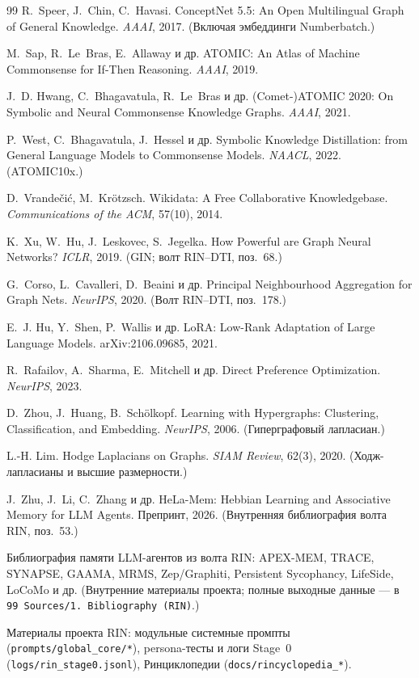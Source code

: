 \begin{thebibliography}{99}
 R.~Speer, J.~Chin, C.~Havasi.
ConceptNet 5.5: An Open Multilingual Graph of General Knowledge. \emph{AAAI},
2017. (Включая эмбеддинги Numberbatch.)

 M.~Sap, R.~Le~Bras, E.~Allaway и др.
ATOMIC: An Atlas of Machine Commonsense for If-Then Reasoning. \emph{AAAI}, 2019.

 J.~D. Hwang, C.~Bhagavatula, R.~Le~Bras и др.
(Comet-)ATOMIC 2020: On Symbolic and Neural Commonsense Knowledge Graphs.
\emph{AAAI}, 2021.

 P.~West, C.~Bhagavatula, J.~Hessel и др.
Symbolic Knowledge Distillation: from General Language Models to Commonsense
Models. \emph{NAACL}, 2022. (ATOMIC10x.)

 D.~Vrande\v{c}i\'c, M.~Kr\"otzsch.
Wikidata: A Free Collaborative Knowledgebase. \emph{Communications of the ACM},
57(10), 2014.

 K.~Xu, W.~Hu, J.~Leskovec, S.~Jegelka.
How Powerful are Graph Neural Networks? \emph{ICLR}, 2019. (GIN; волт RIN–DTI,
поз.~68.)

 G.~Corso, L.~Cavalleri, D.~Beaini и др.
Principal Neighbourhood Aggregation for Graph Nets. \emph{NeurIPS}, 2020.
(Волт RIN–DTI, поз.~178.)

 E.~J. Hu, Y.~Shen, P.~Wallis и др.
LoRA: Low-Rank Adaptation of Large Language Models. arXiv:2106.09685, 2021.

 R.~Rafailov, A.~Sharma, E.~Mitchell и др.
Direct Preference Optimization. \emph{NeurIPS}, 2023.

 D.~Zhou, J.~Huang, B.~Sch\"olkopf.
Learning with Hypergraphs: Clustering, Classification, and Embedding.
\emph{NeurIPS}, 2006. (Гиперграфовый лапласиан.)

 L.-H. Lim. Hodge Laplacians on Graphs.
\emph{SIAM Review}, 62(3), 2020. (Ходж-лапласианы и высшие размерности.)

 J.~Zhu, J.~Li, C.~Zhang и др.
HeLa-Mem: Hebbian Learning and Associative Memory for LLM Agents. Препринт, 2026.
(Внутренняя библиография волта RIN, поз.~53.)

 Библиография памяти LLM-агентов из волта RIN: APEX-MEM, TRACE,
SYNAPSE, GAAMA, MRMS, Zep/Graphiti, Persistent Sycophancy, LifeSide, LoCoMo и др.
(Внутренние материалы проекта; полные выходные данные — в
\texttt{99 Sources/1.~Bibliography (RIN)}.)

 Материалы проекта RIN: модульные системные промпты
(\texttt{prompts/global\_core/*}), persona-тесты и логи Stage~0
(\texttt{logs/rin\_stage0.jsonl}), Ринциклопедии
(\texttt{docs/rincyclopedia\_*}).

\end{thebibliography}

